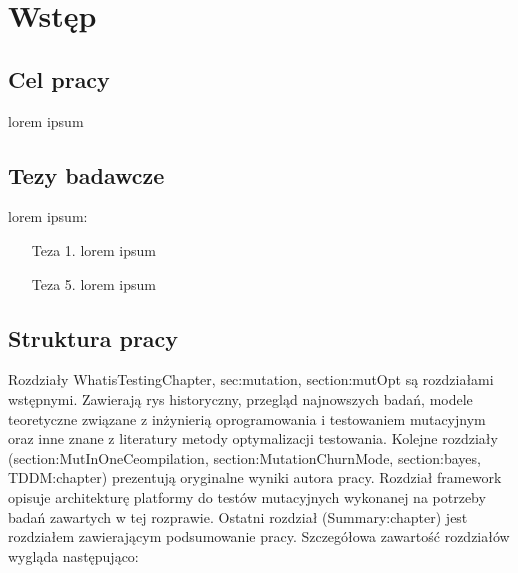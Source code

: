 \documentclass[11pt,a4paper,oldfontcommands]{memoir}
\theoremstyle{plain}
\theoremstyle{definition}
\theoremstyle{remark}
\begin{document}
 \newpage
\listoffigures
 
 \newpage
\listoftables

\newpage
\lstlistoflistings

\clearpage

\chapter{Wstęp}
\section{Cel pracy}
lorem ipsum

\section{Tezy badawcze} \label{sec:tezy}

lorem ipsum:
\begin{itemize}
\item[Teza 1.] lorem ipsum

\item[Teza 5.]lorem ipsum
\end{itemize}


\section{Struktura pracy}
Rozdziały WhatisTestingChapter, sec:mutation, section:mutOpt są rozdziałami wstępnymi. Zawierają rys historyczny, przegląd najnowszych badań, modele teoretyczne związane z inżynierią oprogramowania i testowaniem mutacyjnym oraz inne znane z literatury metody optymalizacji testowania. Kolejne rozdziały (section:MutInOneCeompilation, section:MutationChurnMode, section:bayes, TDDM:chapter) prezentują oryginalne wyniki autora pracy. Rozdział framework opisuje architekturę platformy do testów mutacyjnych wykonanej na potrzeby badań zawartych w tej rozprawie. Ostatni rozdział (Summary:chapter) jest rozdziałem zawierającym podsumowanie pracy. Szczegółowa zawartość rozdziałów wygląda następująco:
\end{document}

